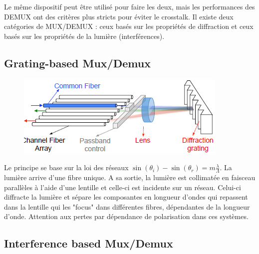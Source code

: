 Le même dispositif peut être utilisé pour faire les deux, mais les performances des DEMUX ont des
critères plus stricts pour éviter le crosstalk. Il existe deux catégories de MUX/DEMUX : ceux 
basés sur les propriétés de diffraction et ceux basés sur les propriétés de la lumière 
(interférences).


\subsection{Grating-based Mux/Demux}
	\begin{figure}
	\includegraphics[scale=0.65]{ch3/image24}
	\end{figure}
Le principe se base sur la loi des réseaux $\sin ({\theta _i}) - \sin ({\theta _r}) = 
m\frac{\lambda }{\Lambda }$.
La lumière arrive d'une fibre unique. A sa sortie, la lumière est collimatée en faisceau parallèles
à l'aide d'une lentille et celle-ci est incidente sur un réseau. Celui-ci diffracte la lumière et
sépare les composantes en longueur d'ondes qui repassent dans la lentille qui les "focus" dans
différentes fibres, dépendantes de la longueur d'onde. Attention aux pertes par dépendance de 
polarisation dans ces systèmes.


\subsection{Interference based Mux/Demux}

